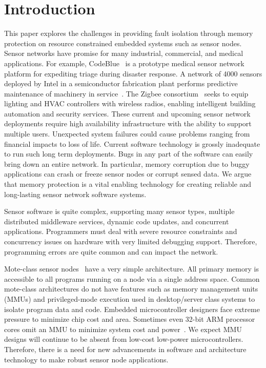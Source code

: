 \section{Introduction}
\label{sec:introduction}
%
This paper explores the challenges in providing fault isolation
through memory protection on resource constrained embedded systems
such as sensor nodes.
%
Sensor networks have promise for many industrial, commercial, and
medical applications.
%
For example, CodeBlue~\cite{welsh04codeblue} is a prototype medical
sensor network platform for expediting triage during disaster
response.
%
A network of 4000 sensors deployed by Intel in a
semiconductor fabrication plant performs predictive maintenance of
machinery in service~\cite{intel05fabapp}.
%
The Zigbee consortium~\cite{zigbee} seeks to equip lighting and
HVAC controllers with wireless radios, enabling intelligent building
automation and security services.
%
These current and upcoming sensor network deployments require high
availability infrastructure with the ability to support multiple users.
%
%
Unexpected system failures could cause problems ranging from financial
impacts to loss of life.
%
Current software technology is grossly inadequate to run such long
term deployments.
%
Bugs in any part of the software can easily bring down an entire network.
%
In particular, memory corruption due to buggy applications can crash or
freeze sensor nodes or corrupt sensed data.
%
We argue that memory protection is a vital enabling technology for
creating reliable and long-lasting sensor network software systems.
%

Sensor software is quite complex, supporting 
%
many sensor types, multiple distributed
middleware services, dynamic code updates, and concurrent applications.
%
Programmers must deal with severe resource constraints and concurrency issues
%
on hardware with very limited debugging support.
%
Therefore, programming errors are quite common and can impact the network.


Mote-class sensor nodes~\cite{jasonhillthesis} have a very simple architecture.
%
All primary memory is accessible to all programs running
on a node via a single address space.
%
Common mote-class architectures do not have features such as memory
management units (MMUs) and privileged-mode execution used in
desktop/server class systems to isolate program data and code.
%
Embedded microcontroller designers face extreme pressure to minimize chip cost and area.
%
Sometimes even 32-bit ARM processor cores omit an MMU to minimize system cost and power~\cite{arm7tdmi}.
%
We expect MMU designs will continue to be absent from low-cost low-power
microcontrollers.
%
Therefore, there is a need for new advancements in software and architecture
technology to make robust sensor node applications.
%
